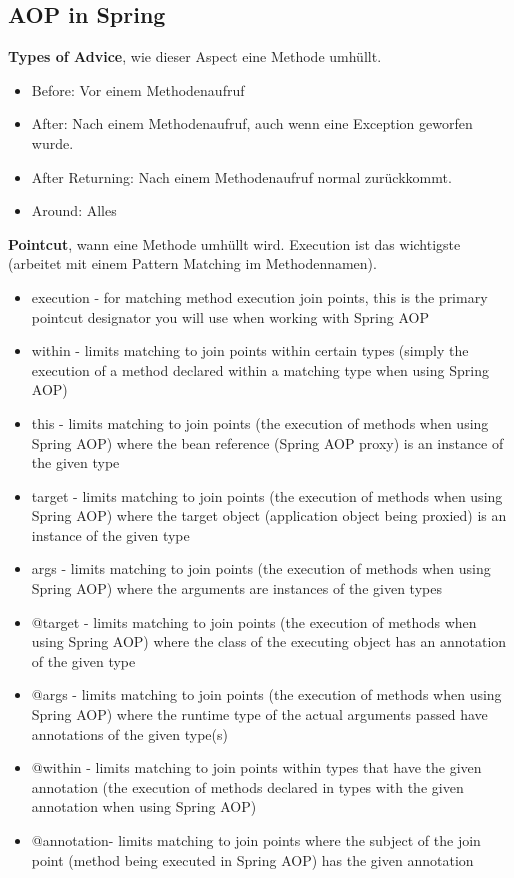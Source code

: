 \documentclass[10pt]{scrartcl}
\newcommand{\Bold}[1]{\textbf{#1}} %
\begin{document}
\subsection{AOP in Spring}



\Bold{Types of Advice}, wie dieser Aspect eine Methode umhüllt.
\begin{itemize}
	\item Before: Vor einem Methodenaufruf
	\item After: Nach einem Methodenaufruf, auch wenn eine Exception geworfen wurde.
	\item After Returning: Nach einem Methodenaufruf normal zurückkommt.
	\item Around: Alles
\end{itemize}

\Bold{Pointcut}, wann eine Methode umhüllt wird. Execution ist das wichtigste (arbeitet mit einem Pattern Matching im Methodennamen).
\begin{itemize}
	\item execution - for matching method execution join points, this is the primary pointcut designator you will use when working with Spring AOP
	\item within - limits matching to join points within certain types (simply the execution of a method declared within a matching type when using Spring AOP)
	\item this - limits matching to join points (the execution of methods when using Spring AOP) where the bean reference (Spring AOP proxy) is an instance of the given type
	\item target - limits matching to join points (the execution of methods when using Spring AOP) where the target object (application object being proxied) is an instance of the given type
	\item args - limits matching to join points (the execution of methods when using Spring AOP) where the arguments are instances of the given types
	\item @target - limits matching to join points (the execution of methods when using Spring AOP) where the class of the executing object has an annotation of the given type
	\item @args - limits matching to join points (the execution of methods when using Spring AOP) where the runtime type of the actual arguments passed have annotations of the given type(s)
	\item @within - limits matching to join points within types that have the given annotation (the execution of methods declared in types with the given annotation when using Spring AOP)
	\item @annotation- limits matching to join points where the subject of the join point (method being executed in Spring AOP) has the given annotation
\end{itemize}
\end{document}
